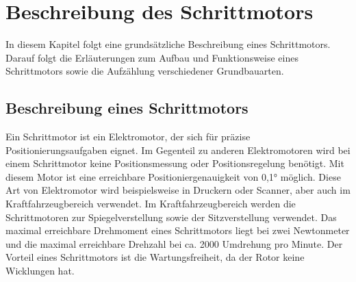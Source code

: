 
%

\chapter{Beschreibung des Schrittmotors}
In diesem Kapitel folgt eine grundsätzliche Beschreibung eines Schrittmotors. Darauf folgt die Erläuterungen zum Aufbau und Funktionsweise eines Schrittmotors sowie die Aufzählung verschiedener Grundbauarten.
\section{Beschreibung eines Schrittmotors}
Ein Schrittmotor ist ein Elektromotor, der sich für präzise Positionierungsaufgaben eignet. Im Gegenteil zu anderen Elektromotoren wird bei einem Schrittmotor keine Positionsmessung oder Positionsregelung benötigt. Mit diesem Motor ist eine erreichbare Positioniergenauigkeit von 0,1° möglich. Diese Art von Elektromotor wird beispielsweise in Druckern oder Scanner, aber auch im Kraftfahrzeugbereich verwendet. Im Kraftfahrzeugbereich werden die Schrittmotoren zur Spiegelverstellung sowie der Sitzverstellung verwendet. Das maximal erreichbare Drehmoment eines Schrittmotors liegt bei zwei Newtonmeter und die maximal erreichbare Drehzahl bei ca. 2000 Umdrehung pro Minute. Der Vorteil eines Schrittmotors ist die Wartungsfreiheit, da der Rotor keine Wicklungen hat. \cite{Babiel.2023}\cite{Hagl.2021}
